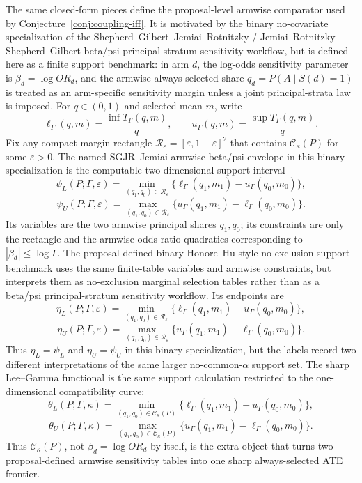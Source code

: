 \documentclass[11pt]{article}
\theoremstyle{definition}
\theoremstyle{plain}
\theoremstyle{remark}
\begin{document}
The same closed-form pieces define the proposal-level armwise comparator used
by Conjecture~\ref{conj:coupling-iff}.  It is motivated by the binary
no-covariate specialization of the Shepherd--Gilbert--Jemiai--Rotnitzky /
Jemiai--Rotnitzky--Shepherd--Gilbert beta/psi principal-stratum sensitivity
workflow, but is defined here as a finite support benchmark: in arm \(d\), the
log-odds sensitivity parameter is
\(\beta_d=\log OR_d\), and the armwise always-selected share
\(q_d=P(A\mid S(d)=1)\) is treated as an arm-specific sensitivity margin unless
a joint principal-strata law is imposed.  For \(q\in(0,1)\) and selected mean
\(m\), write
\[
  \ell_\Gamma(q,m)=\frac{\inf T_\Gamma(q,m)}{q},\qquad
  u_\Gamma(q,m)=\frac{\sup T_\Gamma(q,m)}{q}.
\]
Fix any compact margin rectangle
\(\mathcal R_\varepsilon=[\varepsilon,1-\varepsilon]^2\) that contains
\(\mathcal C_\kappa(P)\) for some \(\varepsilon>0\).  The named
SGJR--Jemiai armwise beta/psi envelope in this binary specialization is the
computable two-dimensional support interval
\[
  \psi_L(P;\Gamma,\varepsilon)
  =
  \min_{(q_1,q_0)\in\mathcal R_\varepsilon}
  \{\ell_\Gamma(q_1,m_1)-u_\Gamma(q_0,m_0)\},
\]
\[
  \psi_U(P;\Gamma,\varepsilon)
  =
  \max_{(q_1,q_0)\in\mathcal R_\varepsilon}
  \{u_\Gamma(q_1,m_1)-\ell_\Gamma(q_0,m_0)\}.
\]
Its variables are the two armwise principal shares \(q_1,q_0\); its constraints
are only the rectangle and the armwise odds-ratio quadratics corresponding to
\(|\beta_d|\le \log\Gamma\).  The proposal-defined binary
Honore--Hu-style no-exclusion support benchmark uses the same finite-table
variables and armwise constraints, but interprets them as no-exclusion marginal
selection tables rather than as a beta/psi principal-stratum sensitivity
workflow.  Its endpoints are
\[
  \eta_L(P;\Gamma,\varepsilon)
  =
  \min_{(q_1,q_0)\in\mathcal R_\varepsilon}
  \{\ell_\Gamma(q_1,m_1)-u_\Gamma(q_0,m_0)\},
\]
\[
  \eta_U(P;\Gamma,\varepsilon)
  =
  \max_{(q_1,q_0)\in\mathcal R_\varepsilon}
  \{u_\Gamma(q_1,m_1)-\ell_\Gamma(q_0,m_0)\}.
\]
Thus \(\eta_L=\psi_L\) and \(\eta_U=\psi_U\) in this binary specialization,
but the labels record two different interpretations of the same larger
no-common-\(\alpha\) support set.  The sharp Lee--Gamma functional
is the same support calculation restricted to the one-dimensional compatibility
curve:
\[
  \theta_L(P;\Gamma,\kappa)
  =
  \min_{(q_1,q_0)\in\mathcal C_\kappa(P)}
  \{\ell_\Gamma(q_1,m_1)-u_\Gamma(q_0,m_0)\},
\]
\[
  \theta_U(P;\Gamma,\kappa)
  =
  \max_{(q_1,q_0)\in\mathcal C_\kappa(P)}
  \{u_\Gamma(q_1,m_1)-\ell_\Gamma(q_0,m_0)\}.
\]
Thus \(\mathcal C_\kappa(P)\), not \(\beta_d=\log OR_d\) by itself, is the
extra object that turns two proposal-defined armwise sensitivity tables into
one sharp always-selected ATE frontier.
\end{document}
